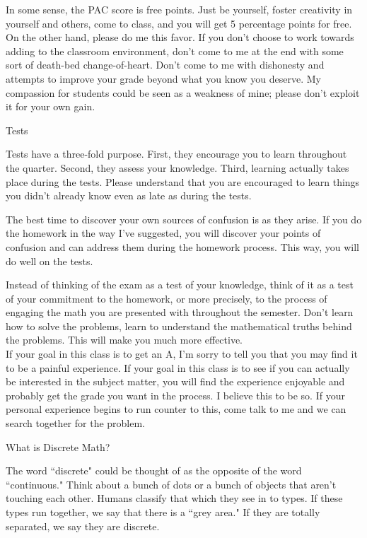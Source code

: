 \documentclass[12pt]{letter}
\begin{document}
In some sense, the PAC score is free points.  Just be yourself, foster 
creativity in yourself and others, come to class, and you will get 5 
percentage points for free.  On the other hand, please do me this favor.  
If you don't choose to work towards adding to the classroom environment, 
don't come to me at the end with some sort of death-bed change-of-heart.  
Don't come to me with dishonesty and attempts to improve your grade beyond 
what you know you deserve.  My compassion for students could be seen as a 
weakness of mine; please don't exploit it for your own gain.

\large Tests \normalsize  

Tests have a three-fold purpose.  First, they encourage you to learn 
throughout the quarter.  Second, they assess your knowledge.  Third, 
learning actually takes place during the tests.  Please understand that 
you are encouraged to learn things you didn't already know even as late as 
during the tests.

The best time to discover your own sources of confusion is as they arise.  
If you do the homework in the way I've suggested, you will discover your 
points of confusion and can address them during the homework process.  
This way, you will do well on the tests.  

Instead of thinking of the exam as a test of your knowledge, think 
of it as a test of your commitment to the homework, or more precisely, to 
the process of engaging the math you are presented with throughout the 
semester.  Don't learn how to solve the problems, learn to understand the 
mathematical truths behind the problems.  This will make you much more 
effective.\\

If your goal in this class is to get an A, I'm sorry to tell you that you 
may find it to be a painful experience.  If your goal in this class is to 
see if you can actually be interested in the subject matter, you will find 
the experience enjoyable and probably get the grade you want in the 
process.  I believe this to be so.  If your personal experience begins to 
run counter to this, come talk to me and we can search together for the 
problem.

\newpage

\Large What is Discrete Math?\normalsize

The word ``discrete" could be thought of as the opposite of the word 
``continuous."  Think about a bunch of dots or a bunch of objects that 
aren't touching each other.  Humans classify that which they see in to 
types.  If these types run together, we say that there is a ``grey area."  
If they are totally separated, we say they are discrete.
\end{document}
